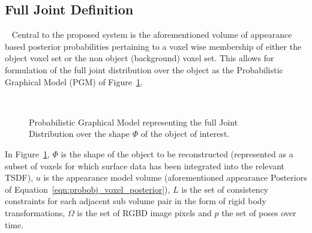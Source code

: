 \subsection{Full Joint Definition}
~\label{subsec:probobj_full_joint}
Central to the proposed system is the aforementioned volume of appearance based
posterior probabilities pertaining to a voxel wise membership of either the
object voxel set or the non object (background) voxel set. This allows for
formulation of the full joint distribution over the object as the Probabilistic
Graphical Model (PGM) of Figure~\ref{figure:probobj_pgm1}.
\begin{figure}[!htbp]
  \centering
  \caption[Probabilistic Object Reconstruction Formulation I]
  {Probabilistic Graphical Model representing the full Joint
    Distribution over the shape \(\Phi\) of the object of interest.}
~\label{figure:probobj_pgm1}
\end{figure}

In Figure~\ref{figure:probobj_pgm1}, \( \Phi \) is the shape of the object to be 
reconstructed (represented as a subset of voxels for which surface data has been 
integrated into the relevant TSDF), \(u\) is the appearance model volume (aforementioned 
appearance Posteriors of Equation~\ref{eqn:probobj_voxel_posterior}), \(L\) is the set 
of consistency constraints for each adjacent sub volume pair in the form of rigid body 
transformations, \( \Omega \) is the set of RGBD image pixels and \(p\) the set of 
poses over time.

